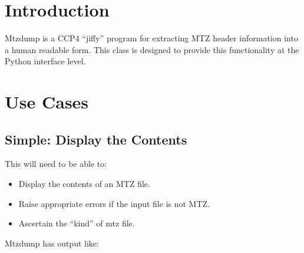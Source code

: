 \documentclass[a4paper, 11pt]{article}
\begin{document}
\section{Introduction}

Mtzdump is a CCP4 ``jiffy'' program for extracting MTZ header information
into a human readable form. This class is designed to provide this 
functionality at the Python interface level.

\section{Use Cases}

\subsection{Simple: Display the Contents}

This will need to be able to:

\begin{itemize}
\item{Display the contents of an MTZ file.}
\item{Raise appropriate errors if the input file is not MTZ.}
\item{Ascertain the ``kind'' of mtz file.}
\end{itemize}

Mtzdump has output like:
\end{document}
